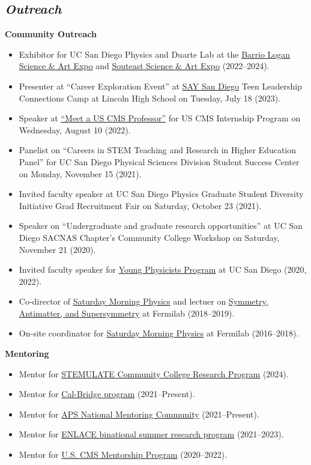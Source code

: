 \documentclass[11pt]{res}
\newcommand{\MarginText}[1]{\section{\textit{#1}}}
\begin{document}
\begin{resume}
  \MarginText{Outreach}
  \textbf{Community Outreach}
  \begin{itemize}
    \itemsep-0.3em
    \item Exhibitor for UC San Diego Physics and Duarte Lab at the \href{https://www.barriologansae.com/}{Barrio Logan Science \& Art Expo} and \href{https://www.southeastsdsteamexpo.com/}{Souteast Science \& Art Expo} ({2022--2024}).
    \item Presenter at ``Career Exploration Event'' at \href{https://saysandiego.org}{SAY San Diego} Teen Leadership Connections Camp at Lincoln High School on Tuesday, July 18 (2023).
    \item Speaker at \href{https://indico.cern.ch/event/1167965/timetable/#93-meet-a-uscms-professorscien}{``Meet a US CMS Professor''} for US CMS Internship Program on Wednesday, August 10 (2022).
    \item Panelist on ``Careers in STEM Teaching and Research in Higher Education Panel'' for UC San Diego Physical Sciences Division Student Success Center on Monday, November 15 ({2021}).
    \item Invited faculty speaker at UC San Diego Physics Graduate Student Diversity Initiative Grad Recruitment Fair on Saturday, October 23 ({2021}).
    \item Speaker on ``Undergraduate and graduate research opportunities'' at UC San Diego SACNAS Chapter's Community College Workshop on Saturday, November 21 ({2020}).
    \item Invited faculty speaker for \href{http://ypp.ucsd.edu/}{Young Physicists Program} at UC San Diego ({2020}, 2022).
    \item Co-director of \href{http://saturdaymorningphysics.fnal.gov/}{Saturday Morning Physics} and lectuer on \href{http://saturdaymorningphysics.fnal.gov/fall-session-2018/}{Symmetry, Antimatter, and Supersymmetry} at Fermilab ({2018--2019}).
    \item On-site coordinator for \href{http://saturdaymorningphysics.fnal.gov/}{Saturday Morning Physics} at Fermilab ({2016--2018}).
  \end{itemize}

  \textbf{Mentoring}
  \begin{itemize}
    \itemsep-0.3em
    \item Mentor for \href{https://ucsdcreate.wordpress.com/2023/02/22/stemulate-community-college-summer-research-program-ucsd-summer-2022/}{STEMULATE Community College Research Program} ({2024}).
    \item Mentor for \href{https://www.cpp.edu/calbridge/index.shtml}{Cal-Bridge program} ({2021--Present}).
    \item Mentor for \href{https://aps.org/programs/minorities/nmc/}{APS National Mentoring Community} (2021--Present).
    \item Mentor for \href{http://resilientmaterials.ucsd.edu/ENLACE}{ENLACE binational summer research program} ({2021--2023}).
    \item Mentor for \href{https://uscms-diversity-equity-inclusion.github.io/mentorship.html}{U.S. CMS Mentorship Program} ({2020--2022}).
  \end{itemize}


\end{resume}
\end{document}
